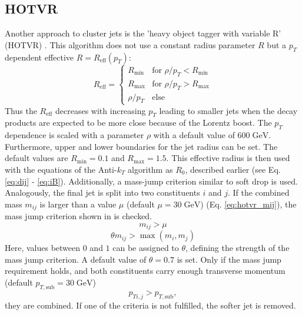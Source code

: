 \subsection{HOTVR}
\label{sec:HOTVR}
	Another approach to cluster jets is the 'heavy object tagger with variable R' (HOTVR) \cite{hotvr}. This algorithm does not use a constant radius parameter $R$ but a $p_T$ dependent effective $R=R_\text{eff}(p_T)$:
	\begin{equation}
	\label{eq:HOTVR}
	  R_\text{eff} =
	   \begin{cases}
	     R_\text{min} & \text{for } \rho / p_T < R_\text{min} \\
	     R_\text{max} & \text{for } \rho / p_T > R_\text{max} \\
	     \rho / p_T & \text{else}  
	   \end{cases}
	\end{equation}
	 Thus the $R_\text{eff}$ decreases with increasing $p_T$ leading to smaller jets when the decay products are expected to be more close because of the Lorentz boost. The $p_T$ dependence is scaled with a parameter $\rho$ with a default value of $600\;\text{GeV}$. Furthermore, upper and lower boundaries for the jet radius can be set. The default values are $R_\text{min} = 0.1$ and $R_\text{max} = 1.5$. This effective radius is then used with the equations of the Anti-$k_T$ algorithm as $R_0$, described earlier (see Eq. \ref{eq:dij} - \ref{eq:iB}). Additionally, a mass-jump criterion similar to soft drop is used. Analogously, the final jet is split into two constituents $i$ and $j$. If the combined mass $m_{ij}$ is larger than a value $\mu$ (default $\mu = 30\;\text{GeV}$) (Eq. \ref{eq:hotvr_mij}), the mass jump criterion shown in is checked.
	\begin{equation}
	m_{ij} > \mu
	\label{eq:hotvr_mij}
	\end{equation}
	\begin{equation}
	\theta m_{ij} > \max(m_i, m_j)
	\label{eq:hotvr_theta}
	\end{equation}
	Here, values between $0$ and $1$ can be assigned to $\theta$, defining the strength of the mass jump criterion. A default value of $\theta =0.7$ is set. Only if the mass jump requirement holds, and both constituents carry enough transverse momentum (default $p_{T,\text{sub}} = 30\;\text{GeV}$)
	\begin{equation}
	p_{Ti,j} > p_{T,\text{sub}},
	\label{eq:hotvr_pt}
	\end{equation}	
	they are combined. If one of the criteria is not fulfilled, the softer jet is removed.
	
